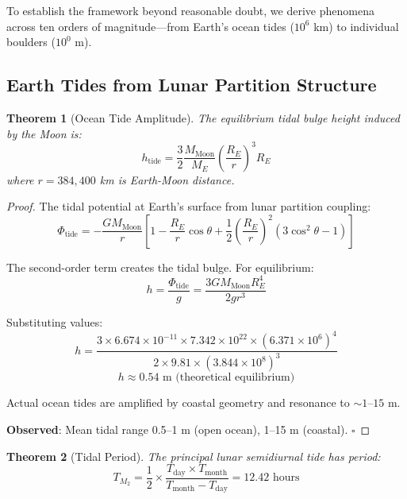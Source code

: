 \documentclass[12pt,a4paper]{article}
\newtheorem{theorem}{Theorem}[section]
\theoremstyle{definition}
\theoremstyle{remark}
\begin{document}
To establish the framework beyond reasonable doubt, we derive phenomena across ten orders of magnitude---from Earth's ocean tides ($10^6$ km) to individual boulders ($10^0$ m).

\subsection{Earth Tides from Lunar Partition Structure}

\begin{theorem}[Ocean Tide Amplitude]
\label{thm:tides}
The equilibrium tidal bulge height induced by the Moon is:
\begin{equation}
h_{\text{tide}} = \frac{3}{2} \frac{M_{\text{Moon}}}{M_E} \left(\frac{R_E}{r}\right)^3 R_E
\end{equation}
where $r = 384,400$ km is Earth-Moon distance.
\end{theorem}

\begin{proof}
The tidal potential at Earth's surface from lunar partition coupling:
\begin{equation}
\Phi_{\text{tide}} = -\frac{GM_{\text{Moon}}}{r} \left[1 - \frac{R_E}{r}\cos\theta + \frac{1}{2}\left(\frac{R_E}{r}\right)^2(3\cos^2\theta - 1)\right]
\end{equation}

The second-order term creates the tidal bulge. For equilibrium:
\begin{equation}
h = \frac{\Phi_{\text{tide}}}{g} = \frac{3GM_{\text{Moon}}R_E^4}{2gr^3}
\end{equation}

Substituting values:
\begin{equation}
h = \frac{3 \times 6.674 \times 10^{-11} \times 7.342 \times 10^{22} \times (6.371 \times 10^6)^4}{2 \times 9.81 \times (3.844 \times 10^8)^3}
\end{equation}
\begin{equation}
h \approx 0.54 \text{ m (theoretical equilibrium)}
\end{equation}

Actual ocean tides are amplified by coastal geometry and resonance to $\sim 1$--$15$ m.

\textbf{Observed}: Mean tidal range 0.5--1 m (open ocean), 1--15 m (coastal). $\square$
\end{proof}

\begin{theorem}[Tidal Period]
\label{thm:tidal_period}
The principal lunar semidiurnal tide has period:
\begin{equation}
T_{M_2} = \frac{1}{2} \times \frac{T_{\text{day}} \times T_{\text{month}}}{T_{\text{month}} - T_{\text{day}}} = 12.42 \text{ hours}
\end{equation}
\end{theorem}
\end{document}
